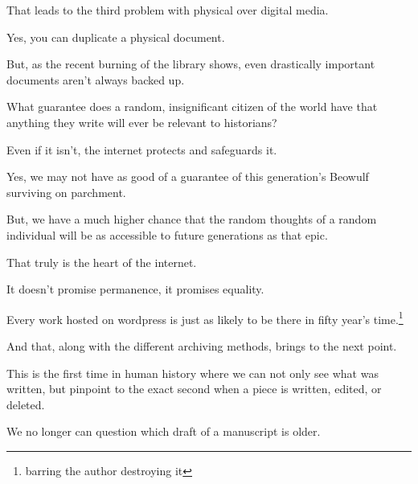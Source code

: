 \documentclass[12pt]{article}[titlepage]
\newcommand{\1}{\={a}}
\newcommand{\2}{\={e}}
\newcommand{\3}{\={\i}}
\newcommand{\4}{\=o}
\newcommand{\5}{\=u}
\newcommand{\6}{\={A}}
\renewcommand{\,}{\textsuperscript{,}}
\begin{document}
That leads to the third problem with physical over digital media.

Yes, you can duplicate a physical document.

But, as the recent burning of the library shows, even drastically important documents aren’t always backed up.

What guarantee does a random, insignificant citizen of the world have that anything they write will ever be relevant to historians?

Even if it isn’t, the internet protects and safeguards it.

Yes, we may not have as good of a guarantee of this generation’s Beowulf surviving on parchment.

But, we have a much higher chance that the random thoughts of a random individual will be as accessible to future generations as that epic.


That truly is the heart of the internet.

It doesn’t promise permanence, it promises equality.

Every work hosted on wordpress is just as likely to be there in fifty year’s time.\footnote{barring the author destroying it}

And that, along with the different archiving methods, brings to the next point.

This is the first time in human history where we can not only see what was written, but pinpoint to the exact second when a piece is written, edited, or deleted.

We no longer can question which draft of a manuscript is older.
\end{document}
